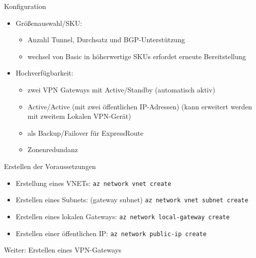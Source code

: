 \begin{flashcard}[Definition]{Konfiguration}
    \begin{itemize}
        \item Größenauswahl/SKU:
            \begin{itemize}
                \item Anzahl Tunnel, Durchsatz und BGP-Unterstützung
                \item wechsel von Basic in höherwertige SKUs erfordet erneute Bereitstellung
            \end{itemize}
        \item Hochverfügbarkeit:
            \begin{itemize}
                \item zwei VPN Gateways mit Active/Standby\newline
                    (automatisch aktiv)
                \item Active/Active (mit zwei öffentlichen IP-Adressen)\newline
                    (kann erweitert werden mit zweitem Lokalen VPN-Gerät)
                \item als Backup/Failover für ExpressRoute
                \item Zonenredundanz
            \end{itemize}
    \end{itemize}
\end{flashcard}

\begin{flashcard}[Definition]{Erstellen der Voraussetzungen}
    \begin{itemize}
        \item Erstellung eines VNETs:\newline
            \texttt{az network vnet create }
        \item Erstellen eines Subnets: (gateway subnet)\newline
            \texttt{az network vnet subnet create}
        \item Erstellen eines lokalen Gateways:\newline
            \texttt{az network local-gateway create}
        \item Erstellen einer öffentlichen IP:\newline
            \texttt{az network public-ip create}
    \end{itemize}

    Weiter: Erstellen eines VPN-Gateways
\end{flashcard}

